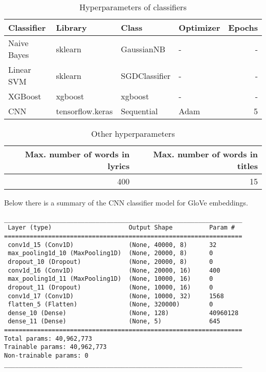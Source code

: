 \begin{table}[h]
\centering
\begin{tabular}{l|l|l|l|r}
\textbf{Classifier} & \textbf{Library} & \textbf{Class} & \textbf{Optimizer} & \textbf{Epochs} \\\hline
Naive Bayes & sklearn & GaussianNB & - & - \\
Linear SVM & sklearn & SGDClassifier & - & - \\
XGBoost & xgboost & xgboost & - & - \\
CNN & tensorflow.keras & Sequential & Adam & 5 \\
\end{tabular}
\caption{Hyperparameters of classifiers}
\label{tab:h_cls}
\end{table}

\begin{table}[h]
\centering
\begin{tabular}{r|r}
\textbf{Max. number of words in lyrics} & \textbf{Max. number of words in titles} \\\hline
400 & 15 \\
\end{tabular}
\caption{Other hyperparameters}
\label{tab:h_other}
\end{table}

Below there is a summary of the CNN classifier model for GloVe embeddings.
\begin{verbatim}
_________________________________________________________________
 Layer (type)                     Output Shape          Param #   
=================================================================
 conv1d_15 (Conv1D)               (None, 40000, 8)      32        
 max_pooling1d_10 (MaxPooling1D)  (None, 20000, 8)      0                     
 dropout_10 (Dropout)             (None, 20000, 8)      0         
 conv1d_16 (Conv1D)               (None, 20000, 16)     400       
 max_pooling1d_11 (MaxPooling1D)  (None, 10000, 16)     0                                  
 dropout_11 (Dropout)             (None, 10000, 16)     0         
 conv1d_17 (Conv1D)               (None, 10000, 32)     1568      
 flatten_5 (Flatten)              (None, 320000)        0         
 dense_10 (Dense)                 (None, 128)           40960128  
 dense_11 (Dense)                 (None, 5)             645       
=================================================================
Total params: 40,962,773
Trainable params: 40,962,773
Non-trainable params: 0
_________________________________________________________________

\end{verbatim}

